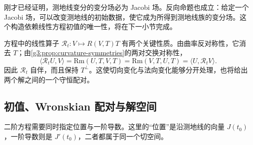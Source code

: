 刚才已经证明，测地线变分的变分场必为 Jacobi 场。反向命题也成立：给定一个 Jacobi 场，可以改变测地线的初始数据，使它成为所得到测地线族的变分场。这个构造依赖线性方程初值的唯一性，将在下一小节完成。

\ProseParagraphBreak

方程中的线性算子 \(\mathcal R_t:V\mapsto R(V,T)T\) 有两个关键性质。由曲率反对称性，它消去 \(T\)；由\cref{g3:prop:curvature-symmetries}的两对交换对称性，
\begin{equation}\label{g3:eq:jacobi-curvature-self-adjoint}
	\langle\mathcal R_tU,V\rangle
	=\mathrm{Rm}(U,T,V,T)
	=\mathrm{Rm}(V,T,U,T)
	=\langle U,\mathcal R_tV\rangle.
\end{equation}
因此 \(\mathcal R_t\) 自伴，而且保持 \(T^\perp\)。这使切向变化与法向变化能够分开处理，也将给出两个解之间的一个守恒配对。

\subsection{初值、Wronskian 配对与解空间}
\label{g3:subsec:0602:02}

二阶方程需要同时指定位置与一阶导数。这里的“位置”是沿测地线的向量 \(J(t_0)\)，一阶导数则是 \(J'(t_0)\)，二者都属于同一个切空间。

